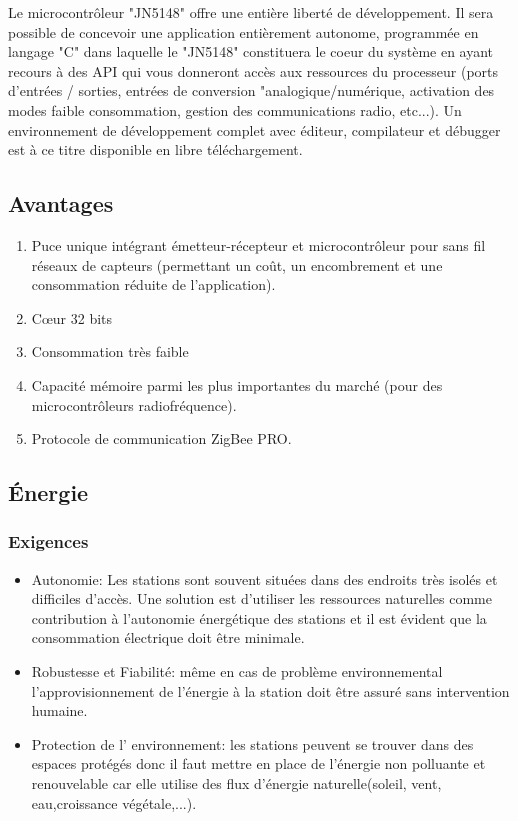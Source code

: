 Le microcontr\^oleur "JN5148" offre une entière libert\'e de d\'eveloppement. Il sera possible de concevoir une application entièrement autonome, programm\'ee en langage "C" dans laquelle le "JN5148" constituera le coeur du système en ayant recours à des API qui vous donneront accès aux ressources du processeur (ports d'entr\'ees / sorties, entr\'ees de conversion "analogique/num\'erique, activation des modes faible consommation, gestion des communications radio, etc...). Un environnement de d\'eveloppement complet avec \'editeur, compilateur et d\'ebugger est à ce titre disponible en libre téléchargement.

\subsection{Avantages}  

\begin{enumerate}
	\item  Puce unique int\'egrant \'emetteur-r\'ecepteur et microcontr\^oleur pour sans fil r\'eseaux de capteurs (permettant un coût, un encombrement et une consommation r\'eduite de l’application).
	\item Cœur 32 bits
	\item Consommation très faible  
	\item Capacit\'e m\'emoire parmi les plus importantes du march\'e (pour des microcontr\^oleurs radiofr\'equence).
	\item Protocole de communication ZigBee PRO.
\end{enumerate}

\subsection{Énergie}

\subsubsection{Exigences}
\begin{itemize}

\item Autonomie: Les stations sont souvent situées dans des endroits très isolés et difficiles d'accès. Une solution est d'utiliser les ressources naturelles comme contribution à l'autonomie énergétique des stations et il est évident que la consommation électrique doit être minimale.

\smallskip \item Robustesse et Fiabilité: même en cas de problème environnemental l'approvisionnement de l'énergie à la station doit être assuré sans intervention humaine.

\smallskip \item Protection de l' environnement: les stations peuvent se trouver dans des espaces prot\'{e}g\'{e}s donc il faut mettre en place de l'\'{e}nergie non polluante et renouvelable car elle utilise des flux d'\'{e}nergie naturelle(soleil, vent, eau,croissance v\'{e}g\'{e}tale,...).
\end{itemize}

